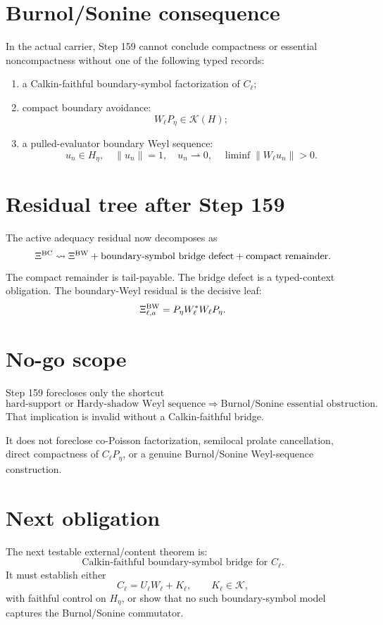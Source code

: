 \documentclass[11pt]{article}
\begin{document}
\section{Burnol/Sonine consequence}
In the actual carrier, Step 159 cannot conclude compactness or essential noncompactness without one of the following typed records:
\begin{enumerate}[label=(\alph*)]
\item a Calkin-faithful boundary-symbol factorization of $C_\ell$;
\item compact boundary avoidance:
\[
  W_\ell P_\eta\in\mathcal K(H);
\]
\item a pulled-evaluator boundary Weyl sequence:
\[
  u_n\in H_\eta,
  \quad \|u_n\|=1,
  \quad u_n\rightharpoonup0,
  \quad \liminf\|W_\ell u_n\|>0.
\]
\end{enumerate}

\section{Residual tree after Step 159}
The active adequacy residual now decomposes as
\[
  \Xi^{\rm BC}
  \leadsto
  \Xi^{\rm BW}
  +
  \text{boundary-symbol bridge defect}
  +
  \text{compact remainder}.
\]
The compact remainder is tail-payable.  The bridge defect is a typed-context obligation.  The boundary-Weyl residual is the decisive leaf:
\[
  \Xi^{\rm BW}_{\ell,a}=P_\eta W_\ell^*W_\ell P_\eta.
\]

\section{No-go scope}
Step 159 forecloses only the shortcut
\[
  \text{hard-support or Hardy-shadow Weyl sequence}
  \Rightarrow
  \text{Burnol/Sonine essential obstruction}.
\]
That implication is invalid without a Calkin-faithful bridge.

It does not foreclose co-Poisson factorization, semilocal prolate cancellation, direct compactness of $C_\ell P_\eta$, or a genuine Burnol/Sonine Weyl-sequence construction.

\section{Next obligation}
The next testable external/content theorem is:
\[
  \boxed{\text{Calkin-faithful boundary-symbol bridge for }C_\ell.}
\]
It must establish either
\[
  C_\ell = U_\ell W_\ell + K_\ell,
  \qquad K_\ell\in\mathcal K,
\]
with faithful control on $H_\eta$, or show that no such boundary-symbol model captures the Burnol/Sonine commutator.
\end{document}
